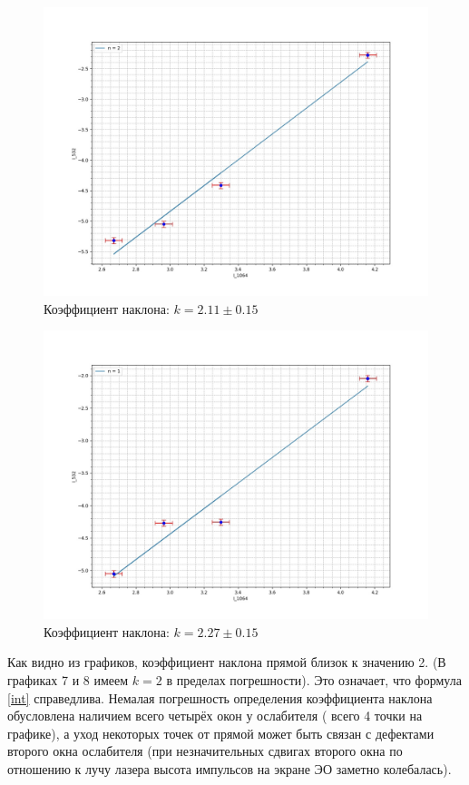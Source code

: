 \documentclass[a4paper,12pt]{article} %
\begin{document}
\begin{enumerate}
\begin{figure}[H]
	\label{graf_4}
	\includegraphics[scale=0.3]{2.jpg}
	\caption{Коэффициент наклона: $k = 2.11 \pm 0.15$}
\end{figure}

\begin{figure}[H]
	\label{graf_4}
	\includegraphics[scale=0.3]{3.jpg}
	\caption{Коэффициент наклона: $k = 2.27 \pm 0.15$}
\end{figure}

Как видно из графиков, коэффициент наклона прямой близок к значению 2. (В графиках 7 и 8 имеем $k = 2$ в пределах погрешности). Это означает, что формула \eqref{int} справедлива. Немалая погрешность
определения коэффициента наклона обусловлена наличием всего четырёх окон у ослабителя ( всего 4 точки на графике), а уход некоторых точек от прямой может быть связан с дефектами второго окна ослабителя (при незначительных сдвигах второго окна по отношению к лучу лазера высота импульсов на экране ЭО заметно колебалась).


\end{enumerate}
\end{document}
